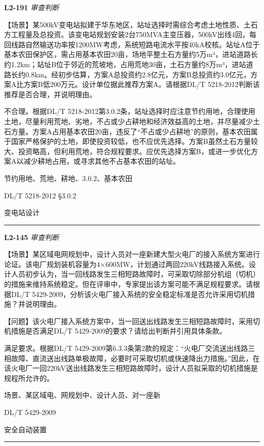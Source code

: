 \documentclass[12pt,a4paper]{ctexart}
\begin{document}
\noindent\textbf{L2-191} \hfill \textit{审查判断}
\begin{description}[leftmargin=1.5em,style=nextline,font=\normalfont]
  \item[Q:] 【场景】某500kV变电站拟建于华东地区，站址选择时需综合考虑土地性质、土石方工程量及总投资。该变电站规划安装2台750MVA主变压器，500kV出线4回，每回线路自然输送功率按1200MW考虑，系统短路电流水平按40kA校核。站址A位于基本农田保护区，需占用基本农田20亩，场地平整土石方量约5万m³，进站道路长约1.2km；站址B位于邻近的荒坡地，占用荒地30亩，土石方量约8万m³，进站道路长约0.8km。经初步估算，方案A总投资约2.8亿元，方案B总投资约3.0亿元，方案A比方案B低200万元。设计单位据此推荐方案A。请根据DL/T 5218-2012判断该推荐是否合理，并说明理由。
  \item[A:] 不合理。根据DL/T 5218-2012第3.0.2条，站址选择时应注意节约用地，合理使用土地，尽量利用荒地、劣地，不占或少占耕地和经济效益高的土地，并尽量减少土石方量。方案A占用基本农田20亩，违反了“不占或少占耕地”的原则，基本农田属于国家严格保护的土地，即使投资较低，也不应优先选择。方案B虽然土石方量较大、投资略高，但利用荒地，符合规程要求。应优先选择方案B，或进一步优化方案A以减少耕地占用，或寻求其他不占基本农田的站址。
  \item[KW:] 节约用地、荒地、耕地、3.0.2、基本农田
  \item[Std:] DL/T 5218-2012 §3.0.2
  \item[Topic:] 变电站设计
\end{description}
\vspace{4pt}
\hrule\vspace{6pt}

\noindent\textbf{L2-145} \hfill \textit{审查判断}
\begin{description}[leftmargin=1.5em,style=nextline,font=\normalfont]
  \item[Q:] 【场景】某区域电网规划中，设计人员对一座新建大型火电厂的接入系统方案进行论证。该电厂规划装机容量为4×600MW，计划通过两回220kV线路接入系统。设计人员初步认为，当一回线路发生三相短路故障时，可采取切除部分机组（切机）的措施来维持系统稳定。但在评审中，专家提出该方案可能不满足规程要求。请根据DL/T 5429-2009，分析该火电厂接入系统的安全稳定标准是否允许采用切机措施？并说明理由。

【问题】该火电厂接入系统方案中，当一回送出线路发生三相短路故障时，采用切机措施是否满足DL/T 5429-2009的要求？请给出判断并引用具体条款。
  \item[A:] 满足要求。根据DL/T 5429-2009第6.3.3条第2款的规定：“火电厂交流送出线路三相故障、直流送出线路单极故障，必要时可采取切机或快速降出力措施。”因此，在该火电厂一回220kV送出线路发生三相短路故障时，设计人员拟采取的切机措施是规程所允许的。
  \item[KW:] 场景、某区域电、网规划中、设计人员、对一座新
  \item[Std:] DL/T 5429-2009
  \item[Topic:] 安全自动装置
\end{description}
\vspace{4pt}
\hrule\vspace{6pt}
\end{document}
